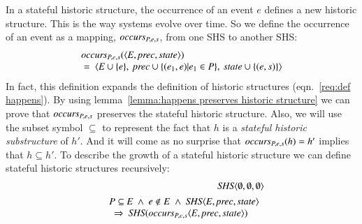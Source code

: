 \documentclass{elsarticle}
\def\id#1{\text{\em #1\/}}
\def\Events{{\mathit E}}
\begin{document}
	In a stateful historic structure, the occurrence of an event $e$ defines a new historic structure.
	This is the way systems evolve over time.
	So we define the occurrence of an event as a mapping, $\id{occurs}_{P,e,s}$, from one SHS to another SHS:
\begin{equation}
\begin{array}{l}
	\id{occurs}_{P,e,s}(\la \Events, \id{prec}, \id{state}\ra)\\
	\ =\ \la \Events\cup\{e\},\ \id{prec}\cup\{(e_1,e) | e_1\in P\},\ \id{state}\cup\{(e,s)\}\ra
\end{array}	
\label{eqn:def occurs}
\end{equation}
	In fact, this definition expands the definition of historic structures (eqn.~\ref{req:def happens}).
	By using lemma~\ref{lemma:happens preserves historic structure} we can prove that $\id{occurs}_{P,e,s}$ preserves
	the stateful historic structure.
	Also, we will use the subset symbol $\subseteq$ to represent the fact that $h$ is a {\em stateful historic substructure} of $h'$.
	And it will come as no surprise that $\id{occurs}_{P,e,s}(h)=h'$ implies that $h\subseteq h'$.
	To describe the growth of a stateful historic structure we can define stateful historic structures recursively:
\begin{eqnarray}
	&&\id{SHS}\la \emptyset, \emptyset, \emptyset\ra\\
&&\begin{array}{@{}l}
	P\subseteq\Events\ \wedge\ e\notin E\ \wedge\ \id{SHS}\la \Events, \id{prec}, \id{state}\ra\\
	\ \ \Rightarrow\ \id{SHS}(\id{occurs}_{P,e,s}\la \Events, \id{prec}, \id{state}\ra)
\end{array}
\label{req:recursive def occurs}
\end{eqnarray}
\end{document}

